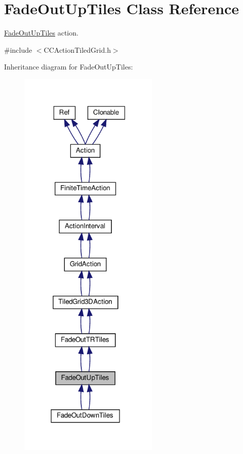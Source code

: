 \hypertarget{classFadeOutUpTiles}{}\section{Fade\+Out\+Up\+Tiles Class Reference}
\label{classFadeOutUpTiles}


\hyperlink{classFadeOutUpTiles}{Fade\+Out\+Up\+Tiles} action.  




{\ttfamily \#include $<$C\+C\+Action\+Tiled\+Grid.\+h$>$}



Inheritance diagram for Fade\+Out\+Up\+Tiles\+:
\nopagebreak
\begin{figure}[H]
\begin{center}
\leavevmode
\includegraphics[width=189pt]{classFadeOutUpTiles__inherit__graph}
\end{center}
\end{figure}


